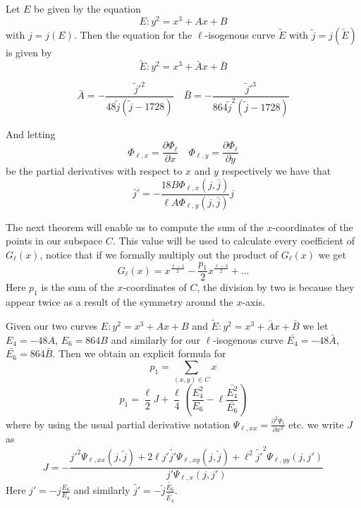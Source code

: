 \begin{thm}
 Let $E$ be given by the equation
$$ E: y^2 = x^3 + Ax + B $$
with $j = j(E)$. Then the equation for the $\ell$-isogenous curve $\tilde{E}$ with
$\tilde{j} = j(\tilde{E})$ is given by
$$ \tilde{E}: y^2 = x^3 + \bar{A}x + \bar{B} $$

$$\bar{A} = -\frac{\tilde{j}'^2}{48 \tilde{j}(\tilde{j} - 1728)} \quad
  \bar{B} = -\frac{\tilde{j}'^3}{864 \tilde{j}^2(\tilde{j} - 1728)} $$

And letting $$\Phi_{\ell, x} = \frac{\partial \Phi_\ell}{\partial x} \quad
              \Phi_{\ell, y} = \frac{\partial \Phi_\ell}{\partial y}$$
be the partial derivatives with respect to $x$ and $y$ respectively we have that
$$ \bar{j}' = -\frac{18 B \Phi_{\ell, x}(j, \bar{j})}{\ell A \Phi_{\ell, y}(j, \bar{j})} j $$
\end{thm}
The next theorem will enable us to compute the sum of the $x$-coordinates of the points in
our subspace $C$. This value will be used to calculate every coefficient of $G_\ell(x)$, notice
that if we formally multiply out the product of $G_\ell(x)$ we get
$$ G_\ell(x) = x^\frac{\ell-1}{2} - \frac{p_1}{2} x^\frac{\ell-3}{2} + \ldots $$
Here $p_1$ is the sum of the $x$-coordinates of $C$, the division by two is because they
appear twice as a result of the symmetry around the $x$-axis.
\begin{thm}
 Given our two curves $E: y^2 = x^3 + Ax + B$ and $\tilde{E}: y^2 = x^3 + \bar{A}x + \bar{B}$ we let
$E_4 = -48A$, $E_6 = 864B$ and similarly for our $\ell$-isogenous curve $\bar{E_4} = -48\bar{A}$,
$\bar{E_6} = 864\bar{B}$. Then we obtain an explicit formula for
$$ p_1 = \sum_{(x,y)\in C} x $$
$$ p_1 = \frac{\ell}{2}J + \frac{\ell}{4} \left( \frac{E_4^2}{E_6} - \ell \frac{\bar{E_4^2}}{\bar{E_6}} \right) $$
where by using the usual partial derivative notation $\Psi_{\ell, xx} = \frac{\partial^2 \Psi_\ell}{\partial x^2}$
etc. we write $J$ as 
$$ J = -\frac{j'^2 \Psi_{\ell, xx}(j, \tilde{j}) + 2\ell j' \tilde{j'} \Psi_{\ell, xy}(j, \tilde{j})
+\ell^2 \tilde{j'}^2 \Psi_{\ell, yy}(j, j')}{j' \Psi_{\ell, x}(j, j')} $$
Here $j'= -j \frac{E_6}{E_4}$ and similarly $\tilde{j'} = -\tilde{j} \frac{\tilde{E_6}}{\tilde{E_4}}$.
\end{thm}

